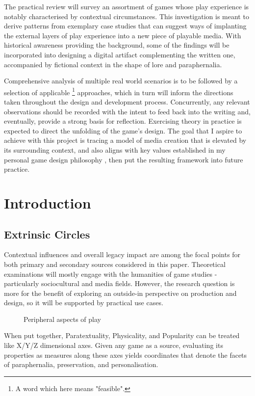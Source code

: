 \documentclass[12pt,oneside]{book}
\begin{document}
\begin{center}
\begin{singlespace}
    The practical review will survey an assortment of games whose play experience is notably characterised by contextual circumstances.
    This investigation is meant to derive patterns from exemplary case studies that can suggest ways of implanting the external layers of play experience into a new piece of playable media.
    With historical awareness providing the background, some of the findings will be incorporated into designing a digital artifact complementing the written one, accompanied by fictional context in the shape of lore and paraphernalia.\par
    Comprehensive analysis of multiple real world scenarios is to be followed by a selection of applicable
    \footnote{A word which here means \parencite{asoue} "feasible".}
    approaches, which in turn will inform the directions taken throughout the design and development process.
    Concurrently, any relevant observations should be recorded with the intent to feed back into the writing and, eventually, provide a strong basis for reflection.
    Exercising theory in practice is expected to direct the unfolding of the game's design.
    The goal that I aspire to achieve with this project is tracing a model of media creation that is elevated by its surrounding context, and also aligns with key values established in my personal game design philosophy \parencite*[GD5609,][]{myDesignPhil}, then put the resulting framework into future practice.
\end{singlespace}\end{center}
\clearpage\restoregeometry\doublespacing

\chapter{Introduction}
\section*{Extrinsic Circles}
Contextual influences and overall legacy impact are among the focal points for both primary and secondary sources considered in this paper.
Theoretical examinations will mostly engage with the humanities of game studies - particularly sociocultural and media fields.
However, the research question is more for the benefit of exploring an outside-in perspective on production and design, so it will be supported by practical use cases.
    \vfill
\begin{figure}[ht]
    \tikzperi\caption{Peripheral aspects of play}\label{peri-play}
\end{figure}
    \vfill
When put together, Paratextuality, Physicality, and Popularity can be treated like X/Y/Z dimensional axes. Given any game as a source, evaluating its properties as measures along these axes yields coordinates that denote the facets of paraphernalia, preservation, and personalisation.
\clearpage
\end{document}
